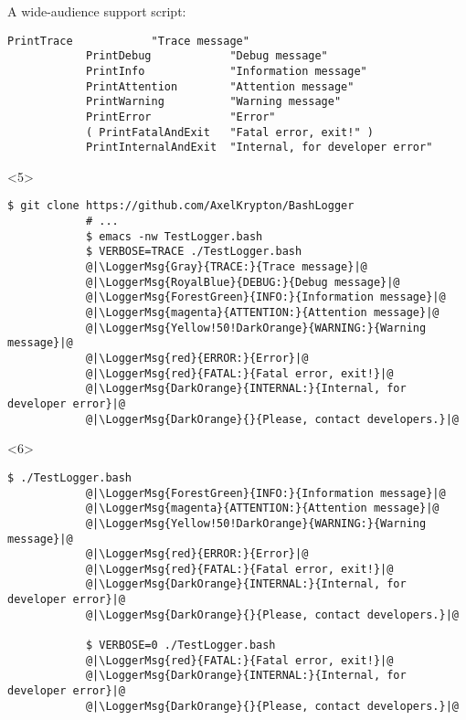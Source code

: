 \begin{frame}[fragile]{A wide-audience support script: }
\begin{onlyenv}
\begin{lstlisting}[style=myBash, numbers=none, style=smaller]
            PrintTrace            "Trace message"
            PrintDebug            "Debug message"
            PrintInfo             "Information message"
            PrintAttention        "Attention message"
            PrintWarning          "Warning message"
            PrintError            "Error"
            ( PrintFatalAndExit   "Fatal error, exit!" )
            PrintInternalAndExit  "Internal, for developer error"
        \end{lstlisting}
    \end{onlyenv}
    \begin{onlyenv}<5>
        \begin{lstlisting}[style=myBash, aboveskip=3mm]
            $ git clone https://github.com/AxelKrypton/BashLogger
            # ...
            $ emacs -nw TestLogger.bash
            $ VERBOSE=TRACE ./TestLogger.bash
            @|\LoggerMsg{Gray}{TRACE:}{Trace message}|@
            @|\LoggerMsg{RoyalBlue}{DEBUG:}{Debug message}|@
            @|\LoggerMsg{ForestGreen}{INFO:}{Information message}|@
            @|\LoggerMsg{magenta}{ATTENTION:}{Attention message}|@
            @|\LoggerMsg{Yellow!50!DarkOrange}{WARNING:}{Warning message}|@
            @|\LoggerMsg{red}{ERROR:}{Error}|@
            @|\LoggerMsg{red}{FATAL:}{Fatal error, exit!}|@
            @|\LoggerMsg{DarkOrange}{INTERNAL:}{Internal, for developer error}|@
            @|\LoggerMsg{DarkOrange}{}{Please, contact developers.}|@
        \end{lstlisting}
    \end{onlyenv}
    \begin{onlyenv}<6>
        \begin{lstlisting}[style=myBash, firstnumber=14, aboveskip=3mm]
            $ ./TestLogger.bash
            @|\LoggerMsg{ForestGreen}{INFO:}{Information message}|@
            @|\LoggerMsg{magenta}{ATTENTION:}{Attention message}|@
            @|\LoggerMsg{Yellow!50!DarkOrange}{WARNING:}{Warning message}|@
            @|\LoggerMsg{red}{ERROR:}{Error}|@
            @|\LoggerMsg{red}{FATAL:}{Fatal error, exit!}|@
            @|\LoggerMsg{DarkOrange}{INTERNAL:}{Internal, for developer error}|@
            @|\LoggerMsg{DarkOrange}{}{Please, contact developers.}|@

            $ VERBOSE=0 ./TestLogger.bash
            @|\LoggerMsg{red}{FATAL:}{Fatal error, exit!}|@
            @|\LoggerMsg{DarkOrange}{INTERNAL:}{Internal, for developer error}|@
            @|\LoggerMsg{DarkOrange}{}{Please, contact developers.}|@
        \end{lstlisting}
    \end{onlyenv}
\end{frame}
